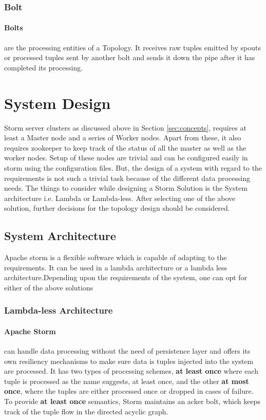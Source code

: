 \documentclass[runningheads,a4paper]{llncs}[2015/06/24]
\begin{document}
\subsubsection{Bolt} 
\paragraph{Bolts} are the processing entities of a Topology. It receives raw tuples emitted by spouts or processed tuples sent by another bolt and sends it down the pipe after it has completed its processing.

\section{System Design}
Storm server clusters as discussed above in Section \ref{sec:concepts}, requires at least a Master node and a series of Worker nodes. Apart from these, it also requires zookeeper to keep track of the status of all the master as well as the worker nodes. Setup of these nodes are trivial and can be configured easily in storm using the configuration files. But, the design of a system with regard to the requirements is not such a trivial task because of the different data processing needs. The things to consider while designing a Storm Solution is the System architecture i.e. Lambda or Lambda-less. After selecting one of the above solution, further decisions for the topology design should be considered.

\subsection{System Architecture}
Apache storm is a flexible software which is capable of adapting to the requirements. It can be used in a lambda architecture or a lambda less architecture.Depending upon the requirements of the system, one can opt for either of the above solutions

\subsubsection{Lambda-less Architecture}
\paragraph{Apache Storm} can handle data processing without the need of persistence layer and offers its own 
resiliency mechanisms to make sure data is tuples injected into the system are processed. It has two types of processing schemes, \textbf{at least once} where each tuple is processed as the name suggests, at least once, and the other \textbf{at most once}, where the tuples are either processed once or dropped in cases of failure. To provide \textbf{at least once} semantics, Storm maintains an acker bolt, which keeps track of the tuple flow in the directed acyclic graph.
\end{document}

